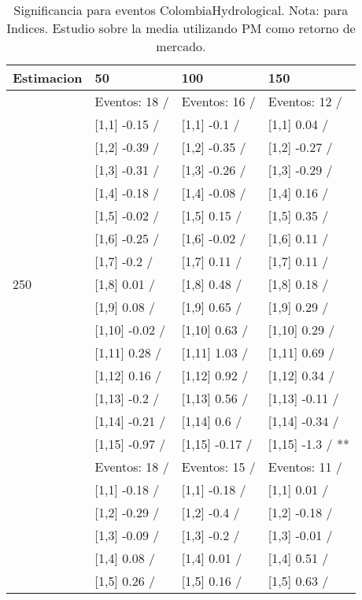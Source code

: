 \begin{table}

\caption{Significancia para eventos ColombiaHydrological. Nota: para Indices. Estudio sobre la media utilizando PM como retorno de mercado.}
\centering
\begin{tabular}[t]{llll}
\toprule
Estimacion & 50 & 100 & 150\\
\midrule
 & Eventos:  18 / & Eventos:  16 / & Eventos:  12 /\\
 & {}[1,1] -0.15  / & {}[1,1] -0.1  / & {}[1,1] 0.04  /\\
 & {}[1,2] -0.39  / & {}[1,2] -0.35  / & {}[1,2] -0.27  /\\
 & {}[1,3] -0.31  / & {}[1,3] -0.26  / & {}[1,3] -0.29  /\\
 & {}[1,4] -0.18  / & {}[1,4] -0.08  / & {}[1,4] 0.16  /\\
\addlinespace
 & {}[1,5] -0.02  / & {}[1,5] 0.15  / & {}[1,5] 0.35  /\\
 & {}[1,6] -0.25  / & {}[1,6] -0.02  / & {}[1,6] 0.11  /\\
 & {}[1,7] -0.2  / & {}[1,7] 0.11  / & {}[1,7] 0.11  /\\
250 & {}[1,8] 0.01  / & {}[1,8] 0.48  / & {}[1,8] 0.18  /\\
 & {}[1,9] 0.08  / & {}[1,9] 0.65  / & {}[1,9] 0.29  /\\
\addlinespace
 & {}[1,10] -0.02  / & {}[1,10] 0.63  / & {}[1,10] 0.29  /\\
 & {}[1,11] 0.28  / & {}[1,11] 1.03  / & {}[1,11] 0.69  /\\
 & {}[1,12] 0.16  / & {}[1,12] 0.92  / & {}[1,12] 0.34  /\\
 & {}[1,13] -0.2  / & {}[1,13] 0.56  / & {}[1,13] -0.11  /\\
 & {}[1,14] -0.21  / & {}[1,14] 0.6  / & {}[1,14] -0.34  /\\
\addlinespace
 & {}[1,15] -0.97  / & {}[1,15] -0.17  / & {}[1,15] -1.3  / **\\
 & Eventos:  18 / & Eventos:  15 / & Eventos:  11 /\\
 & {}[1,1] -0.18  / & {}[1,1] -0.18  / & {}[1,1] 0.01  /\\
 & {}[1,2] -0.29  / & {}[1,2] -0.4  / & {}[1,2] -0.18  /\\
 & {}[1,3] -0.09  / & {}[1,3] -0.2  / & {}[1,3] -0.01  /\\
\addlinespace
 & {}[1,4] 0.08  / & {}[1,4] 0.01  / & {}[1,4] 0.51  /\\
 & {}[1,5] 0.26  / & {}[1,5] 0.16  / & {}[1,5] 0.63  /\\

\end{tabular}
\end{table}
